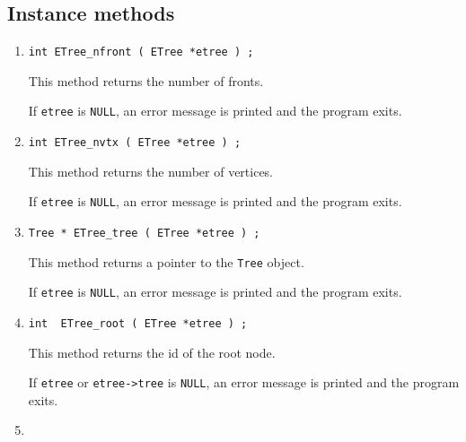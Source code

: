 \subsection{Instance methods}
\label{subsection:ETree:proto:instance}
\par
\begin{enumerate}
\item
\begin{verbatim}
int ETree_nfront ( ETree *etree ) ;
\end{verbatim}
This method returns the number of fronts.
\par {}
If {\tt etree} is {\tt NULL},
an error message is printed and the program exits.
\item
\begin{verbatim}
int ETree_nvtx ( ETree *etree ) ;
\end{verbatim}
This method returns the number of vertices.
\par {}
If {\tt etree} is {\tt NULL},
an error message is printed and the program exits.
\item
\begin{verbatim}
Tree * ETree_tree ( ETree *etree ) ;
\end{verbatim}
This method returns a pointer to the {\tt Tree} object.
\par {}
If {\tt etree} is {\tt NULL},
an error message is printed and the program exits.
\item
\begin{verbatim}
int  ETree_root ( ETree *etree ) ;
\end{verbatim}
This method returns the id of the root node.
\par {}
If {\tt etree} or {\tt etree->tree} is {\tt NULL},
an error message is printed and the program exits.
\item
\begin{verbatim}

\end{verbatim}
\end{enumerate}
